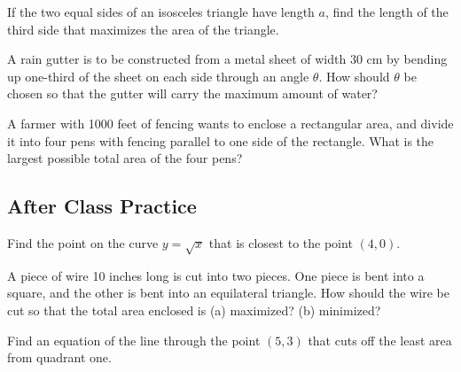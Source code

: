 \documentclass[notes]{subfiles}
\begin{document}
		\begin{ex}
			If the two equal sides of an isosceles triangle have length \(a\), find the length of the third side that maximizes the area of the triangle.
		\end{ex}
			\newpage
			
		\begin{ex}
			A rain gutter is to be constructed from a metal sheet of width 30 cm by bending up one-third of the sheet on each side through an angle \(\theta\).  How should \(\theta\) be chosen so that the gutter will carry the maximum amount of water?
		\end{ex}
			
		\begin{ex}
			A farmer with 1000 feet of fencing wants to enclose a rectangular area, and divide it into four pens with fencing parallel to one side of the rectangle.  What is the largest possible total area of the four pens?
		\end{ex}
			\newpage

	\subsection*{After Class Practice}			
		\begin{ex}
			Find the point on the curve \(y = \sqrt{x}\) that is closest to the point \((4,0)\).
		\end{ex}
			
		\begin{ex}
			A piece of wire 10 inches long is cut into two pieces.  One piece is bent into a square, and the other is bent into an equilateral triangle.  How should the wire be cut so that the total area enclosed is (a) maximized? (b) minimized?
		\end{ex}
			\newpage
			
		\begin{ex}
			Find an equation of the line through the point \((5,3)\) that cuts off the least area from quadrant one.
		\end{ex}	
	
\clearpage
\end{document}
